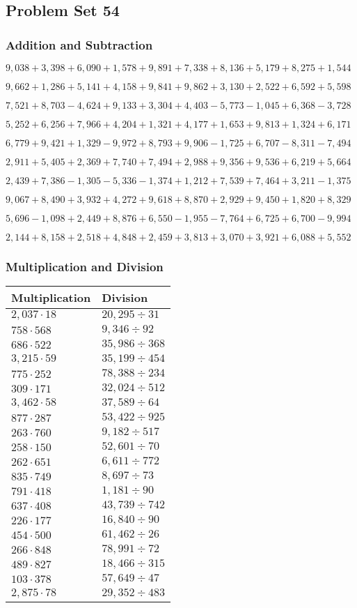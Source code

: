 \hypertarget{problem-set-54-2}{%
\subsection{Problem Set 54}\label{problem-set-54-2}}

\hypertarget{addition-and-subtraction-216}{%
\subsubsection{Addition and
Subtraction}\label{addition-and-subtraction-216}}

\(9,038+3,398+6,090+1,578+9,891+7,338+8,136+5,179+8,275+ 1,544\)

\(9,662+1,286+5,141+4,158+9,841+9,862+3,130+2,522+6,592+5,598\)

\(7,521+8,703-4,624+9,133+3,304+4,403-5,773-1,045+6,368-3,728\)

\(5,252+6,256+7,966+4,204+1,321+4,177+1,653+9,813+1,324+6,171\)

\(6,779+9,421+1,329-9,972+8,793+9,906-1,725+6,707-8,311-7,494\)

\(2,911+5,405+2,369+7,740+7,494+2,988+9,356+9,536+6,219+5,664\)

\(2,439+7,386-1,305-5,336-1,374+1,212+7,539+7,464+3,211-1,375\)

\(9,067+8,490+3,932+4,272+9,618+8,870+2,929+9,450+1,820+8,329\)

\(5,696-1,098+2,449+8,876+6,550-1,955-7,764+6,725+6,700-9,994\)

\(2,144+8,158+2,518+4,848+2,459+3,813+3,070+3,921+6,088+5,552\)

\hypertarget{multiplication-and-division-215}{%
\subsubsection{Multiplication and
Division}\label{multiplication-and-division-215}}

\begin{longtable}[]{@{}ll@{}}
\toprule
Multiplication & Division\tabularnewline
\midrule
\endhead
\(2,037\cdot18\) & \(20,295÷31\)\tabularnewline
\(758\cdot568\) & \(9,346÷92\)\tabularnewline
\(686\cdot522\) & \(35,986÷368\)\tabularnewline
\(3,215\cdot59\) & \(35,199÷454\)\tabularnewline
\(775\cdot252\) & \(78,388÷234\)\tabularnewline
\(309\cdot171\) & \(32,024÷512\)\tabularnewline
\(3,462\cdot58\) & \(37,589÷64\)\tabularnewline
\(877\cdot287\) & \(53,422÷925\)\tabularnewline
\(263\cdot760\) & \(9,182÷517\)\tabularnewline
\(258\cdot150\) & \(52,601÷70\)\tabularnewline
\(262\cdot651\) & \(6,611÷772\)\tabularnewline
\(835\cdot749\) & \(8,697÷73\)\tabularnewline
\(791\cdot418\) & \(1,181÷90\)\tabularnewline
\(637\cdot408\) & \(43,739÷742\)\tabularnewline
\(226\cdot177\) & \(16,840÷90\)\tabularnewline
\(454\cdot500\) & \(61,462÷26\)\tabularnewline
\(266\cdot848\) & \(78,991÷72\)\tabularnewline
\(489\cdot827\) & \(18,466÷315\)\tabularnewline
\(103\cdot378\) & \(57,649÷47\)\tabularnewline
\(2,875\cdot78\) & \(29,352÷483\)\tabularnewline
\bottomrule
\end{longtable}

